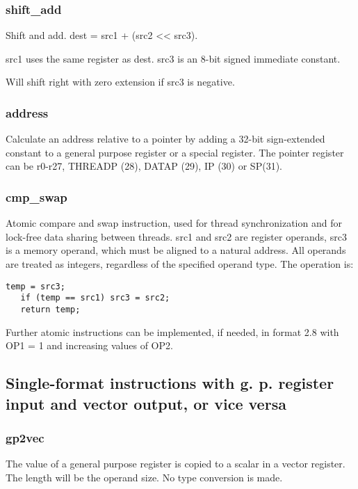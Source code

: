 \documentclass[forwardcom.tex]{subfiles}
\begin{document}
\subsubsection{shift\_add}
Shift and add. dest = src1 + (src2 \textless\textless{}  src3).
\vspace{2mm}

src1 uses the same register as dest. src3 is an 8-bit signed immediate constant.
\vspace{2mm}

Will shift right with zero extension if src3 is negative.

\subsubsection{address}
Calculate an address relative to a pointer by adding a 32-bit sign-extended constant to a general purpose register or a special register. The pointer register can be r0-r27, THREADP (28), DATAP (29), IP (30) or SP(31).

\subsubsection{cmp\_swap}
Atomic compare and swap instruction, used for thread synchronization and for lock-free data sharing between threads. src1 and src2 are register operands, src3 is a memory operand, which must be aligned to a natural address. All operands are treated as integers, regardless of the specified operand type. The operation is:

\begin{lstlisting}[frame=none]
   temp = src3;
   if (temp == src1) src3 = src2;
   return temp;
\end{lstlisting}

Further atomic instructions can be implemented, if needed, in format 2.8 with OP1 = 1 and increasing values of OP2.

\subsection{Single-format instructions with g. p. register input and vector output, or vice versa}

\subsubsection{gp2vec}
The value of a general purpose register is copied to a scalar in a vector register. The length will be the operand size. No type conversion is made.
\end{document}

